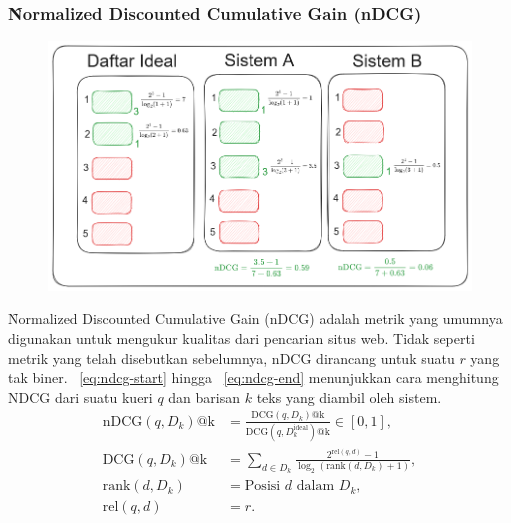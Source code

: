     \subsubsection{\f{Normalized Discounted Cumulative Gain} (nDCG)}

        \begin{figure}[!ht]
            \centering
            \includegraphics[width=1\textwidth]{assets/pics/contohnDCG.png}
            \label{fig:ndcg}
        \end{figure}
        \f{Normalized Discounted Cumulative Gain} (nDCG) adalah metrik yang umumnya digunakan untuk mengukur kualitas dari pencarian situs web. Tidak seperti metrik yang telah disebutkan sebelumnya, nDCG dirancang untuk suatu $r$ yang tak biner. \equ~\ref{eq:ndcg-start} hingga \equ~\ref{eq:ndcg-end} menunjukkan cara menghitung NDCG dari suatu kueri $q$ dan barisan $k$ teks yang diambil oleh sistem.
        \begin{align}
            \label{eq:ndcg-start}
            \text{nDCG}(q, D_k)\text{@k} &= \frac{\text{DCG}(q, D_k)\text{@k}}{\text{DCG}(q, D_k^{\text{ideal}})\text{@k}} \in [0, 1], \\
            \label{eq:dcg}
            \text{DCG}(q, D_k)\text{@k} &= \sum_{d \in D_k} \frac{2^{\text{rel}(q, d)} - 1}{\log_2(\text{rank}(d, D_k) + 1)}, \\
            \text{rank}(d,D_k) &= \text{Posisi } d \text{ dalam } D_k, \\
            \text{rel}(q, d) &= r.
            \label{eq:ndcg-end}
        \end{align}

